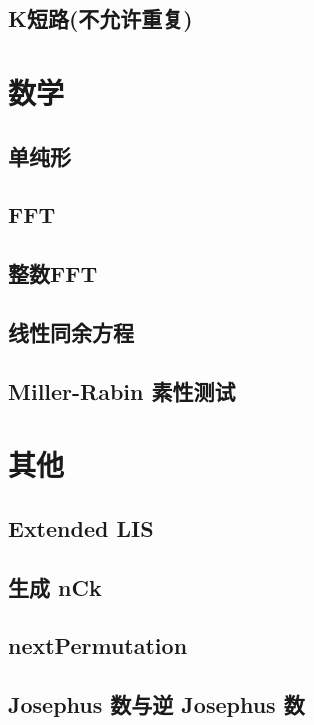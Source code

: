 \documentclass[10pt]{article}
\begin{document}
	\subsection{K短路(不允许重复)}

\section{数学}
	\subsection{单纯形}
	
	\subsection{FFT}

	\subsection{整数FFT}

	\subsection{线性同余方程}

	\subsection{Miller-Rabin 素性测试}

\section{其他}
	\subsection{Extended LIS}
	
	\subsection{生成 nCk}
	
	\subsection{nextPermutation}
	
	\subsection{Josephus 数与逆 Josephus 数}	
\end{document}
